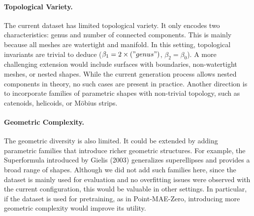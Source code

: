 \paragraph{Topological Variety.} 
The current dataset has limited topological variety. It only encodes two characteristics: genus and number of connected components. This is mainly because all meshes are watertight and manifold. In this setting, topological invariants are trivial to deduce ($\beta_1= 2 \times \text("genus")$, $\beta_2=\beta_0$). A more challenging extension would include surfaces with boundaries, non-watertight meshes, or nested shapes. While the current generation process allows nested components in theory, no such cases are present in practice. Another direction is to incorporate families of parametric shapes with non-trivial topology, such as catenoids, helicoids, or Möbius strips.


\paragraph{Geometric Complexity.} The geometric diversity is also limited. It could be extended by adding parametric families that introduce richer geometric structures. For example, the Superformula introduced by Gielis (2003) \cite{superformula} generalizes superellipses and provides a broad range of shapes. Although we did not add such families here, since the dataset is mainly used for evaluation and no overfitting issues were observed with the current configuration, this would be valuable in other settings. In particular, if the dataset is used for pretraining, as in Point-MAE-Zero, introducing more geometric complexity would improve its utility.


